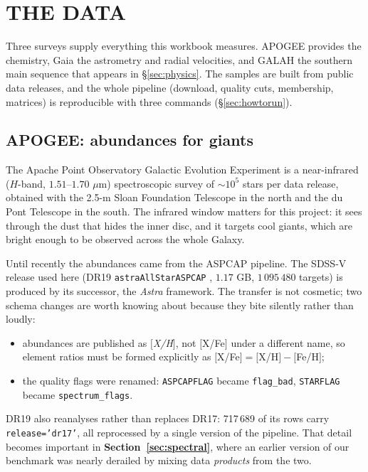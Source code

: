 \section{THE DATA}
\label{sec:data}


Three surveys supply everything this workbook measures. APOGEE provides the
chemistry, Gaia the astrometry and radial velocities, and GALAH the southern
main sequence that appears in \S\ref{sec:physics}. The samples are built from
public data releases, and the whole pipeline (download, quality cuts,
membership, matrices) is reproducible with three commands
(\S\ref{sec:howtorun}).

\subsection{APOGEE: abundances for giants}

The Apache Point Observatory Galactic Evolution Experiment
\citep{Majewski:17} is a near-infrared
($H$-band, $1.51$--$1.70$ $\mu$m) spectroscopic survey of $\sim\!10^5$ stars
per data release, obtained with the 2.5-m Sloan Foundation Telescope in the
north and the du Pont Telescope in the south. The infrared window matters for
this project: it sees through the dust that hides the inner disc, and it
targets cool giants, which are bright enough to be observed across the whole
Galaxy.

Until recently the abundances came from the ASPCAP pipeline. The SDSS-V release
used here (DR19 \texttt{astraAllStarASPCAP} \citep{Almeida:23}, $1.17$ GB,
$1\,095\,480$ targets) is produced by its successor, the \emph{Astra}
framework. The transfer is not cosmetic; two schema changes are worth knowing
about because they bite silently rather than loudly:

\begin{itemize}
\item abundances are published as \emph{$[$X/H$]$}, not $[$X/Fe$]$ under a
  different name, so element ratios must be formed explicitly as
  $[$X/Fe$] = [$X/H$] - [$Fe/H$]$;
\item the quality flags were renamed: \texttt{ASPCAPFLAG} became
\texttt{flag\_bad}, \texttt{STARFLAG} became \texttt{spectrum\_flags}.
\end{itemize}

DR19 also reanalyses rather than replaces DR17: 717\,689 of its rows carry
\texttt{release='dr17'}, all reprocessed by a single version of the pipeline.
That detail becomes important in \textbf{Section~\ref{sec:spectral}}, where an
earlier version of our benchmark was nearly derailed by mixing data
\emph{products} from the two.

